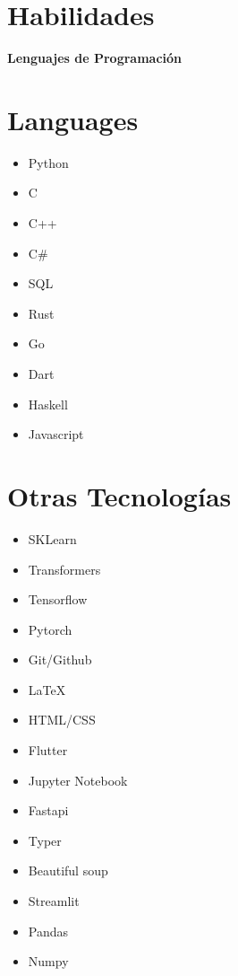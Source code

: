 \documentclass{article}
\begin{document}
\section*{Habilidades}
\begin{multicols}{2}
\raggedcolumns
\textbf{Lenguajes de Programación}
\section*{Languages}
\begin{itemize}
    \item 
    Python
    \item 
    C
    \item 
    C++
    \item 
    C\#
    \item 
    SQL
    \item 
    Rust
    \item 
    Go
    \item 
    Dart
    \item 
    Haskell
    \item 
    Javascript
\end{itemize}

\section*{Otras Tecnologías}
\begin{itemize}
    \item  SKLearn
    \item Transformers
    \item Tensorflow
    \item Pytorch
    \item Git/Github
    \item LaTeX
    \item HTML/CSS
    \item Flutter
    \item Jupyter Notebook
    \item Fastapi
    \item Typer
    \item Beautiful soup
    \item Streamlit
    \item Pandas
    \item Numpy
\end{itemize}

\end{multicols}
\end{document}
